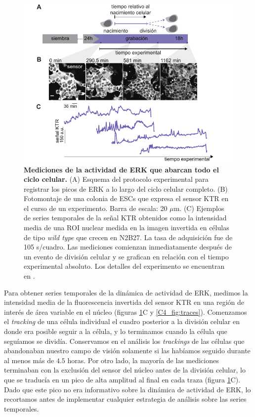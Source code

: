 \documentclass[./main.tex]{subfiles}
\begin{document}
\begin{figure}
    \centering
    \includegraphics[width=1\columnwidth]{figures/chapter4/C4_experiment.pdf}
    \caption{\textbf{Mediciones de la actividad de ERK que abarcan todo el ciclo celular.} (A) Esquema del protocolo experimental para registrar los picos de ERK a lo largo del ciclo celular completo. (B) Fotomontaje de una colonia de ESCs que expresa el sensor KTR en el curso de un experimento. Barra de escala: 20 $\mu$m. (C) Ejemplos de series temporales de la señal KTR obtenidos como la intensidad media de una ROI nuclear medida en la imagen invertida en células de tipo \textit{wild type} que crecen en N2B27. La tasa de adquisición fue de 105 s/cuadro. Las mediciones comienzan inmediatamente después de un evento de división celular y se grafican en relación con el tiempo experimental absoluto. Los detalles del experimento se encuentran en \cite{Fabris2022}.}
    \label{C4_fig:experiment}
\end{figure}

Para obtener series temporales de la dinámica de actividad de ERK, medimos la intensidad media de la fluorescencia invertida del sensor KTR en una región de interés de área variable en el núcleo (figuras \ref{C4_fig:experiment}C y \ref{C4_fig:traces}). Comenzamos el \textit{tracking} de una célula individual el cuadro posterior a la división celular en donde era posible seguir a la célula, y lo terminamos cuando la célula que seguíamos se dividía. Conservamos en el análisis los \textit{trackings} de las células que abandonaban nuestro campo de visión solamente si las habíamos seguido durante al menos más de $4.5$ horas. Por otro lado, la mayoría de las mediciones terminaban con la exclusión del sensor del núcleo antes de la división celular, lo que se traducía en un pico de alta amplitud al final en cada traza (figura \ref{C4_fig:experiment}C). Dado que este pico no era informativo sobre la dinámica de actividad de ERK, lo recortamos antes de implementar cualquier estrategia de análisis sobre las series temporales. 
\end{document}
